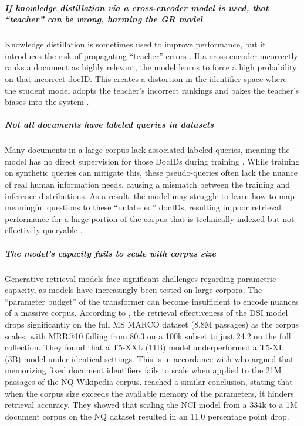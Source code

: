 \subparagraph{If knowledge distillation via a cross-encoder model is used, that ``teacher'' can be wrong, harming the GR model}
Knowledge distillation is sometimes used to improve  performance, but it introduces the risk of propagating ``teacher'' errors \cite{li-distillation-enhanced}. If a cross-encoder incorrectly ranks a document as highly relevant, the  model learns to force a high probability on that incorrect docID. This creates a distortion in the identifier space where the student model adopts the teacher's incorrect rankings and bakes the teacher's biases into the  system \cite{yongqi-li-learning-to}.

\subparagraph{Not all documents have labeled queries in datasets}
Many documents in a large corpus lack associated labeled queries, meaning the  model has no direct supervision for those DocIDs during training \cite{tzulin-kuo-a-survey}. While training on synthetic queries can mitigate this, these pseudo-queries often lack the nuance of real human information needs, causing a mismatch between the training and inference distributions. As a result, the model may struggle to learn how to map meaningful questions to these ``unlabeled'' docIDs, resulting in poor retrieval performance for a large portion of the corpus that is technically indexed but not effectively queryable \cite{ronak-pradeep-how-does}.

\subparagraph{The model’s capacity fails to scale with corpus size}
Generative retrieval models face significant challenges regarding parametric capacity, as models have increasingly been tested on large corpora. The ``parameter budget'' of the transformer can become insufficient to encode nuances of a massive corpus. According to \citet{ronak-pradeep-how-does}, the retrieval effectiveness of the DSI \cite{yi-tay-transformer-memory} model drops significantly on the full MS MARCO dataset \cite{payal-bajaj-ms-marco} (8.8M passages) as the corpus scales, with MRR@10 falling from 80.3 on a 100k subset to just 24.2 on the full collection. They found that a T5-XXL (11B) \cite{colin-raffel-exploring-the} model underperformed a T5-XL (3B) model under identical settings. This is in accordance with \citet{michele-bevilacqua-autoregressive-search} who argued that memorizing fixed document identifiers fails to scale when applied to the 21M passages of the NQ \cite{kwiatkowski-natural-questions} Wikipedia corpus. \citet{peiwen-yuan-generative-dense} reached a similar conclusion, stating that when the corpus size exceeds the available memory of the parameters, it hinders retrieval accuracy. They showed that scaling the NCI \cite{yujing-wang-a-neural} model from a 334k to a 1M document corpus on the NQ \cite{kwiatkowski-natural-questions} dataset resulted in an 11.0 percentage point drop.

